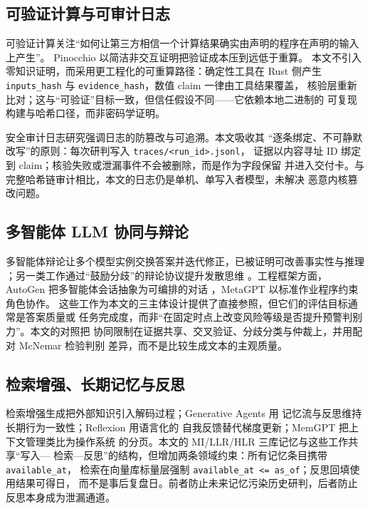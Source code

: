 \documentclass[UTF8,fontset=fandol,11pt,a4paper]{ctexart}
\begin{document}
\subsection{可验证计算与可审计日志}

可验证计算关注“如何让第三方相信一个计算结果确实由声明的程序在声明的输入上产生”。
Pinocchio 以简洁非交互证明把验证成本压到远低于重算\citep{parno2013pinocchio}。
本文不引入零知识证明，而采用更工程化的可重算路径：确定性工具在 Rust 侧产生
\texttt{inputs\_hash} 与 \texttt{evidence\_hash}，数值 claim 一律由工具结果覆盖，
核验层重新比对；这与“可验证”目标一致，但信任假设不同——它依赖本地二进制的
可复现构建与哈希口径，而非密码学证明。

安全审计日志研究强调日志的防篡改与可追溯\citep{schneier1999audit}。本文吸收其
“逐条绑定、不可静默改写”的原则：每次研判写入 \texttt{traces/<run\_id>.jsonl}，
证据以内容寻址 ID 绑定到 claim；核验失败或泄漏事件不会被删除，而是作为字段保留
并进入交付卡。与完整哈希链审计相比，本文的日志仍是单机、单写入者模型，未解决
恶意内核篡改问题。

\subsection{多智能体 LLM 协同与辩论}

多智能体辩论让多个模型实例交换答案并迭代修正，已被证明可改善事实性与推理
\citep{du2023debate}；另一类工作通过“鼓励分歧”的辩论协议提升发散思维
\citep{liang2023mad}。工程框架方面，AutoGen 把多智能体会话抽象为可编排的对话
\citep{wu2023autogen}，MetaGPT 以标准作业程序约束角色协作\citep{hong2023metagpt}。
这些工作为本文的三主体设计提供了直接参照，但它们的评估目标通常是答案质量或
任务完成度，而非“在固定时点上改变风险等级是否提升预警判别力”。本文的对照把
协同限制在证据共享、交叉验证、分歧分类与仲裁上，并用配对 McNemar 检验判别
差异，而不是比较生成文本的主观质量。

\subsection{检索增强、长期记忆与反思}

检索增强生成把外部知识引入解码过程\citep{lewis2020rag}；Generative Agents 用
记忆流与反思维持长期行为一致性\citep{park2023generative}；Reflexion 用语言化的
自我反馈替代梯度更新\citep{shinn2023reflexion}；MemGPT 把上下文管理类比为操作系统
的分页\citep{packer2023memgpt}。本文的 MI/LLR/HLR 三库记忆与这些工作共享“写入—
检索—反思”的结构，但增加两条领域约束：所有记忆条目携带 \texttt{available\_at}，
检索在向量库标量层强制 \texttt{available\_at <= as\_of}；反思回填使用结果可得日，
而不是事后复盘日。前者防止未来记忆污染历史研判，后者防止反思本身成为泄漏通道。
\end{document}
